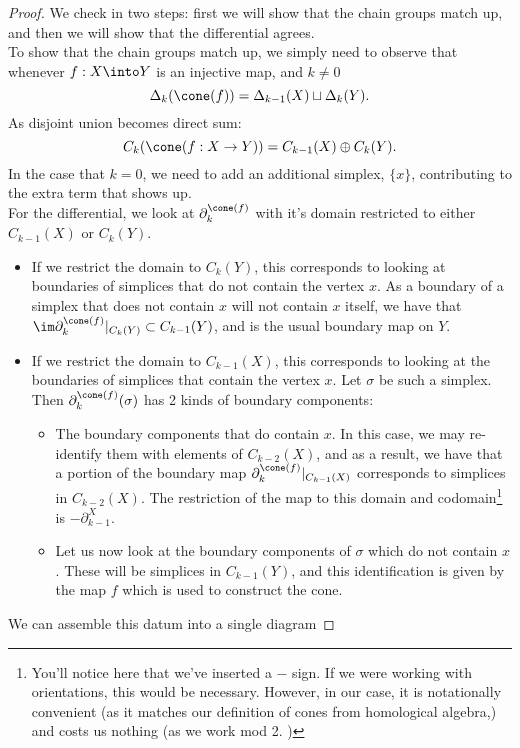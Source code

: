 \begin{proof}
We check in two steps: first we will show that the chain groups match up, and then we will show that the differential agrees.\\
To show that the chain groups match up, we simply need to observe that whenever $f:X\into Y$ is an injective map, and $k\neq 0$
\[\Delta_k(\cone(f))=\Delta_{k-1}(X)\sqcup \Delta_{k}(Y).\]
As disjoint union becomes direct sum:
\[C_k(\cone(f: X\to Y)) = C_{k-1}(X)\oplus C_k(Y).\]
In the case that $k=0$, we need to add an additional simplex, $\{x\}$, contributing to the extra term that shows up. \\
For the differential, we look at $\partial_k^{\cone(f)}$ with it's domain restricted to either $C_{k-1}(X)$ or $C_k(Y)$. 
\begin{itemize}
\item If we restrict the domain to $C_{k}(Y)$, this corresponds to looking at boundaries of simplices that do not contain the vertex $x$. As a boundary of a simplex that does not contain $x$ will not contain $x$ itself, we have that $\im \partial^{\cone(f)}_{k}|_{C_k(Y)}\subset C_{k-1}(Y)$, and is the usual boundary map on $Y$. 
\item If we restrict the domain to $C_{k-1}(X)$, this corresponds to looking at the boundaries of simplices that contain the vertex $x$. Let $\sigma$ be such a simplex. Then $\partial_{k}^{\cone(f)}(\sigma)$ has 2 kinds of boundary components:
\begin{itemize}
\item The boundary components that do contain $x$. In this case, we may re-identify them with elements of $C_{k-2}(X)$, and as a result, we have that a portion of the boundary map $\partial_{k}^{\cone(f)}|_{C_{k-1}(X)}$ corresponds to simplices in $C_{k-2}(X)$. The restriction of the map to this domain and codomain\footnote{You'll notice here that we've inserted a $-$ sign. If we were working with orientations, this would be necessary. However, in our case, it is notationally convenient (as it matches our definition of cones from homological algebra,) and costs us nothing (as we work mod 2. )} is $-\partial_{k-1}^X$. 
\item Let us now look at the boundary components of $\sigma$ which do not contain $x$. These will be simplices in $C_{k-1}(Y)$, and this identification is given by the map $f$ which is used to construct the cone. 
\end{itemize}
\end{itemize}
We can assemble this datum into a single diagram 

\end{proof}
